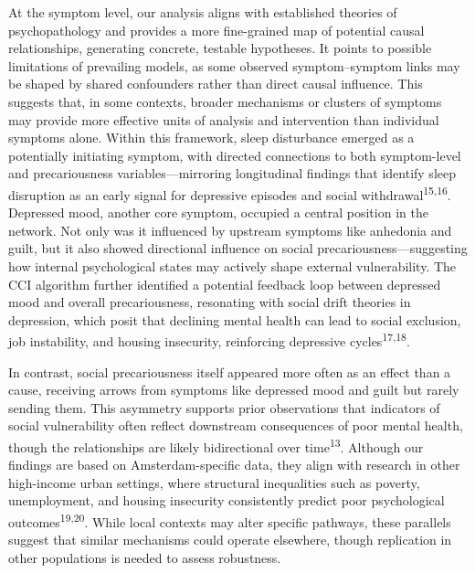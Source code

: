 \documentclass[
]{article}
\begin{document}
At the symptom level, our analysis aligns with established theories of
psychopathology and provides a more fine-grained map of potential causal
relationships, generating concrete, testable hypotheses. It points to
possible limitations of prevailing models, as some observed
symptom--symptom links may be shaped by shared confounders rather than
direct causal influence. This suggests that, in some contexts, broader
mechanisms or clusters of symptoms may provide more effective units of
analysis and intervention than individual symptoms alone. Within this
framework, sleep disturbance emerged as a potentially initiating
symptom, with directed connections to both symptom-level and
precariousness variables---mirroring longitudinal findings that identify
sleep disruption as an early signal for depressive episodes and social
withdrawal\textsuperscript{15,16}. Depressed mood, another core symptom,
occupied a central position in the network. Not only was it influenced
by upstream symptoms like anhedonia and guilt, but it also showed
directional influence on social precariousness---suggesting how internal
psychological states may actively shape external vulnerability. The CCI
algorithm further identified a potential feedback loop between depressed
mood and overall precariousness, resonating with social drift theories
in depression, which posit that declining mental health can lead to
social exclusion, job instability, and housing insecurity, reinforcing
depressive cycles\textsuperscript{17,18}.

In contrast, social precariousness itself appeared more often as an
effect than a cause, receiving arrows from symptoms like depressed mood
and guilt but rarely sending them. This asymmetry supports prior
observations that indicators of social vulnerability often reflect
downstream consequences of poor mental health, though the relationships
are likely bidirectional over time\textsuperscript{13}. Although our
findings are based on Amsterdam-specific data, they align with research
in other high-income urban settings, where structural inequalities such
as poverty, unemployment, and housing insecurity consistently predict
poor psychological outcomes\textsuperscript{19,20}. While local contexts
may alter specific pathways, these parallels suggest that similar
mechanisms could operate elsewhere, though replication in other
populations is needed to assess robustness.
\end{document}
